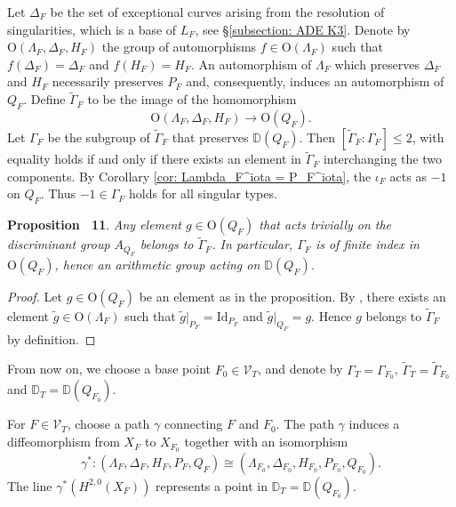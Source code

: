 \documentclass[
]{article}
\begin{document}
Let \(\Delta_{F}\) be the set of exceptional curves arising from the
resolution of singularities, which is a base of \(L_F\), see
§\ref{subsection: ADE K3}. Denote by
\(\mathrm{O}(\Lambda_F, \Delta_F, H_F)\) the group of automorphisms
\(f\in \mathrm{O}(\Lambda_F)\) such that \(f(\Delta_F)=\Delta_F\) and
\(f(H_F)=H_F\). An automorphism of \(\Lambda_{F}\) which preserves
\(\Delta_{F}\) and \(H_{F}\) necessarily preserves \(P_{F}\) and,
consequently, induces an automorphism of \(Q_{F}\). Define
\(\widetilde\Gamma_{F}\) to be the image of the homomorphism
\[\mathrm{O}(\Lambda_{F}, \Delta_{F},H_{F})\to \mathrm{O}(Q_{F}).\] Let
\(\Gamma_F\) be the subgroup of \(\widetilde\Gamma_{F}\) that preserves
\(\mathbb{D}(Q_F)\). Then \([\widetilde{\Gamma}_F : \Gamma_F] \leq 2\),
with equality holds if and only if there exists an element in
\(\widetilde{\Gamma}_F\) interchanging the two components. By Corollary
\ref{cor: Lambda_F^iota = P_F^iota}, the \(\iota_F\) acts as \(-1\) on
\(Q_F\). Thus \(-1\in\Gamma_F\) holds for all singular types.

\textbf{Proposition~ 11}. \emph{Any element \(g\in\mathrm{O}(Q_{F})\)
that acts trivially on the discriminant group \(A_{Q_{F}}\) belongs to
\(\widetilde{\Gamma}_{F}\). In particular, \(\Gamma_{F}\) is of finite
index in \(\mathrm{O}(Q_{F})\), hence an arithmetic group acting on
\(\mathbb{D}(Q_{F})\).}

\emph{Proof.} Let \(g\in\mathrm{O}(Q_{F})\) be an element as in the
proposition. By \cite[Corollary 1.5.2]{nikulin1979integer}, there exists
an element \(\widetilde{g}\in \mathrm{O}(\Lambda_F)\) such that
\(\widetilde{g}|_{P_F}=\mathrm{Id}_{P_F}\) and
\(\widetilde{g}|_{Q_F}=g\). Hence \(g\) belongs to
\(\widetilde{\Gamma}_F\) by definition.~◻

From now on, we choose a base point \(F_0\in \mathcal{V}_T\), and denote
by \(\Gamma_T=\Gamma_{F_0}\),
\(\widetilde{\Gamma}_T=\widetilde{\Gamma}_{F_0}\) and
\(\mathbb{D}_T=\mathbb{D}(Q_{F_0})\).

For \(F\in \mathcal{V}_T\), choose a path \(\gamma\) connecting \(F\)
and \(F_0\). The path \(\gamma\) induces a diffeomorphism from \(X_F\)
to \(X_{F_0}\) together with an isomorphism
\[\gamma^*\colon (\Lambda_F, \Delta_F, H_F, P_F, Q_F)\cong (\Lambda_{F_0}, \Delta_{F_0}, H_{F_0}, P_{F_0}, Q_{F_0}).\]
The line \(\gamma^*(H^{2,0}(X_F))\) represents a point in
\(\mathbb{D}_T=\mathbb{D}(Q_{F_0})\).
\end{document}
